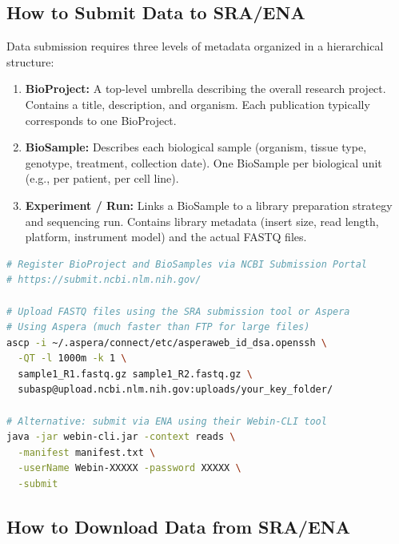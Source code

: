 \subsection{How to Submit Data to SRA/ENA}

Data submission requires three levels of metadata organized in a hierarchical structure:

\begin{enumerate}[itemsep=2pt]
  \item \textbf{BioProject:} A top-level umbrella describing the overall research project. Contains a title, description, and organism. Each publication typically corresponds to one BioProject.
  \item \textbf{BioSample:} Describes each biological sample (organism, tissue type, genotype, treatment, collection date). One BioSample per biological unit (e.g., per patient, per cell line).
  \item \textbf{Experiment / Run:} Links a BioSample to a library preparation strategy and sequencing run. Contains library metadata (insert size, read length, platform, instrument model) and the actual FASTQ files.
\end{enumerate}

\begin{lstlisting}[language=bash,caption={Submitting data to SRA using the SRA Toolkit.},label=lst:sra-submit]
# Register BioProject and BioSamples via NCBI Submission Portal
# https://submit.ncbi.nlm.nih.gov/

# Upload FASTQ files using the SRA submission tool or Aspera
# Using Aspera (much faster than FTP for large files)
ascp -i ~/.aspera/connect/etc/asperaweb_id_dsa.openssh \
  -QT -l 1000m -k 1 \
  sample1_R1.fastq.gz sample1_R2.fastq.gz \
  subasp@upload.ncbi.nlm.nih.gov:uploads/your_key_folder/

# Alternative: submit via ENA using their Webin-CLI tool
java -jar webin-cli.jar -context reads \
  -manifest manifest.txt \
  -userName Webin-XXXXX -password XXXXX \
  -submit
\end{lstlisting}

\subsection{How to Download Data from SRA/ENA}

